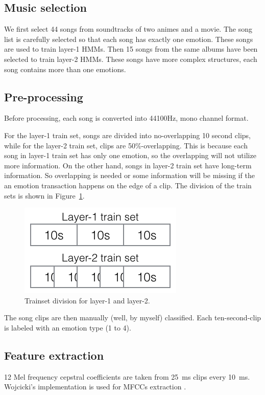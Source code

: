 \documentclass{IEEEtran}
\begin{document}
  \subsection{Music selection}

  We first select 44 songs from soundtracks of two animes and a movie. The
  song list is carefully selected so that each song has exactly one emotion.
  These songs are used to train layer-1 HMMs. Then 15 songs from the same
  albums have been selected to train layer-2 HMMs. These songs have more
  complex structures, each song contains more than one emotions.

  \subsection{Pre-processing}
  Before processing, each song is converted into 44100Hz, mono channel format.

  For the layer-1 train set, songs are divided into no-overlapping 10 second
  clips, while for the layer-2 train set, clips are 50\%-overlapping. This is
  because each song in layer-1 train set has only one emotion, so the
  overlapping will not utilize more information. On the other hand,
  songs in layer-2 train set have long-term information. So overlapping is
  needed or some information will be missing if the an emotion transaction
  happens on the edge of a clip. The division of the train sets is shown in
  Figure~\ref{fig:trainset_division}.

  \begin{figure}[htbp]
    \centering
    \includegraphics[width=0.6\columnwidth]{trainset_division.png}
    \caption{Trainset division for layer-1 and layer-2.}
    \label{fig:trainset_division}
  \end{figure}

  The song clips are then manually (well, by myself) classified. Each
  ten-second-clip is labeled with an emotion type (1 to 4).

  \subsection{Feature extraction}
  12 Mel frequency cepstral coefficients are taken from 25~ms clips every
  10~ms. Wojcicki's implementation is used for MFCCs extraction \cite{wojcicki2011htk}.
\end{document}
